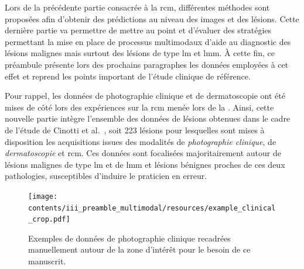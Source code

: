 \renewcommand{\thechapter}{\roman{chapter}}
\setcounter{chapter}{4}
\setcounter{figure}{0}

\label{chap:preamble_multimodal}
Lors de la précédente partie consacrée à la \acrlong{rcm}, différentes méthodes sont proposées afin d'obtenir des prédictions au niveau des images et des lésions. Cette dernière partie va permettre de mettre au point et d'évaluer des stratégies permettant la mise en place de processus multimodaux d'aide au diagnostic des lésions malignes mais surtout des lésions de type \gls{lm} et \gls{lmm}. À cette fin, ce préambule présente lors des prochains paragraphes les données employées à cet effet et reprend les points important de l'étude clinique de référence.\par

Pour rappel, les données de photographie clinique et de dermatoscopie ont été mises de côté lors des expériences sur la \gls{rcm} menée lors de la . Ainsi, cette nouvelle partie intègre l'ensemble des données de lésions obtenues dans le cadre de l'étude de Cinotti et al.~\cite{Cinotti2018}, soit 223 lésions pour lesquelles sont mises à disposition les acquisitions issues des modalités de \textit{photographie clinique}, de \textit{dermatoscopie} et \gls{rcm}. Ces données sont focalisées majoritairement autour de lésions malignes de type \gls{lm} et de \gls{lmm} et lésions bénignes proches de ces deux pathologies, susceptibles d'induire le praticien en erreur.\par 

\begin{figure}[H]
    \begin{center}
        \texttt{[image: contents/iii\_preamble\_multimodal/resources/example\_clinical\_crop.pdf]}
        \caption{Exemples de données de photographie clinique recadrées manuellement autour de la zone d'intérêt pour le besoin de ce manuscrit.}
        \label{fig:example_clinical_crop}
    \end{center} 
\end{figure}\par
\clearpage

